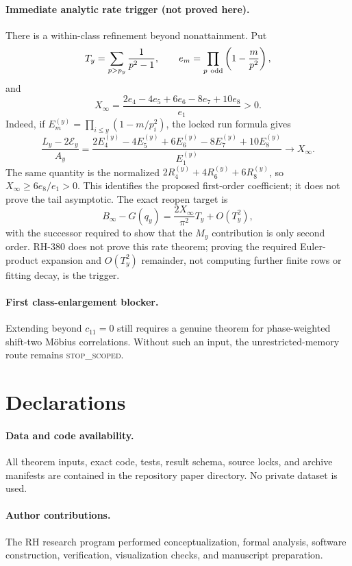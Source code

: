 \documentclass[11pt]{article}
\theoremstyle{definition}
\theoremstyle{remark}
\newcommand{\Ecal}{\mathcal E}
\begin{document}
\paragraph{Immediate analytic rate trigger (not proved here).}
There is a within-class refinement beyond nonattainment.  Put
\[
 T_y=\sum_{p>p_y}\frac1{p^2-1},\qquad
 e_m=\prod_{p\ {\rm odd}}\left(1-\frac{m}{p^2}\right),
\]
and
\[
 X_\infty=
 \frac{2e_4-4e_5+6e_6-8e_7+10e_8}{e_1}>0.
\]
Indeed, if
$E_m^{(y)}=\prod_{i\le y}(1-m/p_i^2)$, the locked run formula gives
\[
 \frac{L_y-2\Ecal_y}{A_y}
 =\frac{2E_4^{(y)}-4E_5^{(y)}+6E_6^{(y)}
              -8E_7^{(y)}+10E_8^{(y)}}{E_1^{(y)}}
 \longrightarrow X_\infty.
\]
The same quantity is the normalized
$2R_4^{(y)}+4R_6^{(y)}+6R_8^{(y)}$, so
$X_\infty\ge6e_8/e_1>0$.  This identifies the proposed first-order
coefficient; it does not prove the tail asymptotic.
The exact reopen target is
\[
 B_\infty-G(q_y)=\frac{2X_\infty}{\pi^2}T_y+O(T_y^2),
\]
with the successor required to show that the $M_y$ contribution is only
second order.  RH-380 does not prove this rate theorem; proving the required
Euler-product expansion and $O(T_y^2)$ remainder, not computing further
finite rows or fitting decay, is the trigger.

\paragraph{First class-enlargement blocker.}
Extending beyond $c_{11}=0$ still requires a genuine theorem for
phase-weighted shift-two M\"obius correlations.  Without such an input, the
unrestricted-memory route remains \textsc{stop\_scoped}.

\section*{Declarations}

\paragraph{Data and code availability.}
All theorem inputs, exact code, tests, result schema, source locks, and
archive manifests are contained in the repository paper directory.  No
private dataset is used.

\paragraph{Author contributions.}
The RH research program performed conceptualization, formal analysis,
software construction, verification, visualization checks, and manuscript
preparation.
\end{document}
